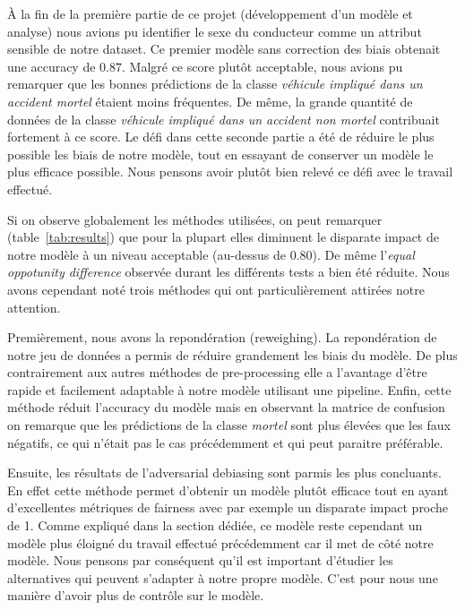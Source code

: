 \documentclass{article}
\begin{document}
    À la fin de la première partie de ce projet (développement d'un modèle et analyse) nous avions pu 
    identifier le sexe du conducteur comme un attribut sensible de notre dataset. Ce premier modèle 
    sans correction des biais obtenait une accuracy de $0.87$. Malgré ce score plutôt acceptable, nous 
    avions pu remarquer que les bonnes prédictions de la classe \textit{véhicule impliqué dans un accident 
    mortel} étaient moins fréquentes.
    De même, la grande quantité de données de la classe \textit{véhicule impliqué dans un accident 
    non mortel} contribuait fortement à ce score. 
    Le défi dans cette seconde partie a été de réduire le plus possible les biais de notre modèle, tout 
    en essayant de conserver un modèle le plus efficace possible. Nous pensons avoir plutôt bien relevé ce 
    défi avec le travail effectué.

    Si on observe globalement les méthodes utilisées, on peut remarquer (table~\ref{tab:results}) que pour la plupart elles 
    diminuent le disparate impact de notre modèle à un niveau acceptable (au-dessus de 0.80). De même l'\textit{equal 
    oppotunity difference} observée durant les différents tests a bien été réduite. 
    Nous avons cependant noté trois méthodes qui ont particulièrement attirées notre attention.

    Premièrement, nous avons la repondération (reweighing). La repondération de notre jeu de données a 
    permis de réduire grandement les biais du modèle. De plus contrairement aux autres méthodes de 
    pre-processing elle a l'avantage d'être rapide et facilement adaptable à notre modèle utilisant une 
    pipeline. Enfin, cette méthode réduit l'accuracy du modèle mais en observant la matrice de confusion 
    on remarque que les prédictions de la classe \textit{mortel} sont plus élevées que les faux négatifs, 
    ce qui n'était pas le cas précédemment et qui peut paraitre préférable.

    Ensuite, les résultats de l'adversarial debiasing sont parmis les plus concluants. En effet cette 
    méthode permet d'obtenir un modèle plutôt efficace tout en ayant d'excellentes métriques de fairness avec 
    par exemple un disparate impact proche de 1. Comme expliqué dans la section dédiée, ce modèle reste cependant 
    un modèle plus éloigné du travail effectué précédemment car il met de côté notre modèle. Nous pensons par
     conséquent qu'il est important d'étudier les alternatives qui peuvent s'adapter à notre propre modèle.
    C'est pour nous une manière d'avoir plus de contrôle sur le modèle.
\end{document}
